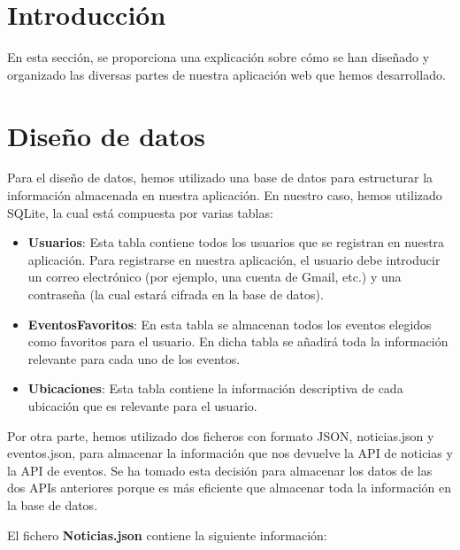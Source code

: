 
\section{Introducción}

En esta sección, se proporciona una explicación sobre cómo se han diseñado y organizado las diversas partes de nuestra aplicación web que hemos desarrollado.

\section{Diseño de datos}

Para el diseño de datos, hemos utilizado una base de datos para estructurar la información almacenada en nuestra aplicación. En nuestro caso, hemos utilizado SQLite, la cual está compuesta por varias tablas: 

\begin{itemize}
    \item \textbf{Usuarios}: Esta tabla contiene todos los usuarios que se registran en nuestra aplicación. Para registrarse en nuestra aplicación, el usuario debe introducir un correo electrónico (por ejemplo, una cuenta de Gmail, etc.) y una contraseña (la cual estará cifrada en la base de datos).
    
    \item \textbf{EventosFavoritos}: En esta tabla se almacenan todos los eventos elegidos como favoritos para el usuario. En dicha tabla se añadirá toda la información relevante para cada uno de los eventos.
    
    \item \textbf{Ubicaciones}: Esta tabla contiene la información descriptiva de cada ubicación que es relevante para el usuario.
\end{itemize}


Por otra parte, hemos utilizado dos ficheros con formato JSON, noticias.json y eventos.json, para almacenar la información que nos devuelve la API de noticias y la API de eventos. Se ha tomado esta decisión para almacenar los datos de las dos APIs anteriores porque es más eficiente que almacenar toda la información en la base de datos.

El fichero \textbf{Noticias.json} contiene la siguiente información:

